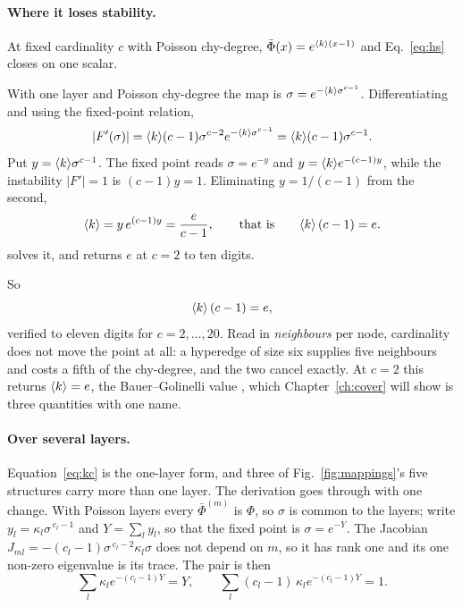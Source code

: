 \paragraph{Where it loses stability.} At fixed cardinality $c$ with Poisson
chy-degree, $\bar\Phi(x)=e^{\langle k \rangle(x-1)}$ and Eq.~\eqref{eq:hs} closes on one
scalar.

With one layer and Poisson chy-degree the map is
$\sigma=e^{-\langle k \rangle\sigma^{c-1}}$. Differentiating and using the fixed-point
relation,
\[
  |F'(\sigma)|=\langle k \rangle(c-1)\sigma^{c-2}e^{-\langle k \rangle\sigma^{c-1}}
             =\langle k \rangle(c-1)\sigma^{c-1}.
\]
Put $y=\langle k \rangle\sigma^{c-1}$. The fixed point reads $\sigma=e^{-y}$ and
$y=\langle k \rangle e^{-(c-1)y}$, while the instability $|F'|=1$ is $(c-1)y=1$.
Eliminating $y=1/(c-1)$ from the second,
\[
  \langle k \rangle=y\,e^{(c-1)y}=\frac{e}{c-1},
  \qquad\text{that is}\qquad
  \langle k \rangle\,(c-1)=e.
\]  solves it, and returns $e$ at $c=2$ to ten digits.

So
\begin{equation}
  \langle k \rangle\,(c-1)=e,
  \label{eq:kc}
\end{equation}
verified to eleven digits for $c=2,\dots,20$. Read in \emph{neighbours} per
node, cardinality does not move the point at all: a hyperedge of size six
supplies five neighbours and costs a fifth of the chy-degree, and the two cancel
exactly. At $c=2$ this returns $\langle k \rangle=e$, the Bauer--Golinelli value
\citep{bauer2001}, which Chapter~\ref{ch:cover} will show is three quantities
with one name.

\paragraph{Over several layers.} Equation~\eqref{eq:kc} is the one-layer form,
and three of Fig.~\ref{fig:mappings}'s five structures carry more than one
layer. The derivation goes through with one change. With Poisson layers every
$\bar\Phi^{(m)}$ is $\Phi$, so $\sigma$ is common to the layers; write
$y_{l}=\kappa_{l}\sigma^{\,c_{l}-1}$ and $Y=\sum_{l}y_{l}$, so that the fixed
point is $\sigma=e^{-Y}$. The Jacobian
$J_{ml}=-(c_{l}-1)\sigma^{\,c_{l}-2}\kappa_{l}\sigma$ does not depend on $m$,
so it has rank one and its one non-zero eigenvalue is its trace. The pair is
then
\begin{equation}
  \sum_{l}\kappa_{l}e^{-(c_{l}-1)Y}=Y,
  \qquad
  \sum_{l}(c_{l}-1)\,\kappa_{l}e^{-(c_{l}-1)Y}=1.
  \label{eq:kcmulti}
\end{equation}

